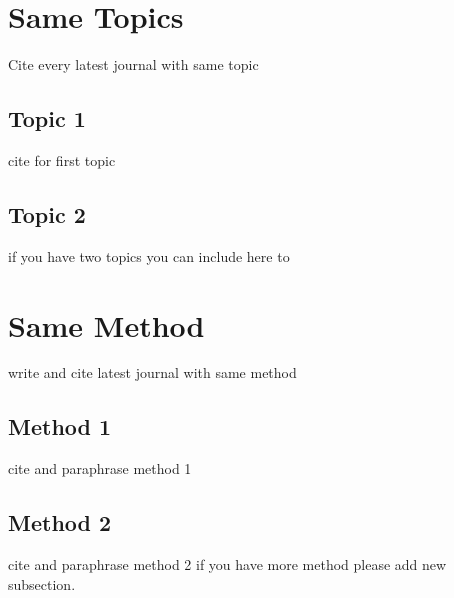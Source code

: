 \section{Same Topics}
Cite every latest journal with same topic
\subsection{Topic 1}
cite for first topic

\subsection{Topic 2}
if you have two topics you can include here to


\section{Same Method}
write and cite latest journal with same method

\subsection{Method 1}
cite and paraphrase method 1

\subsection{Method 2}
cite and paraphrase method 2 if you have more method please add new subsection.




 